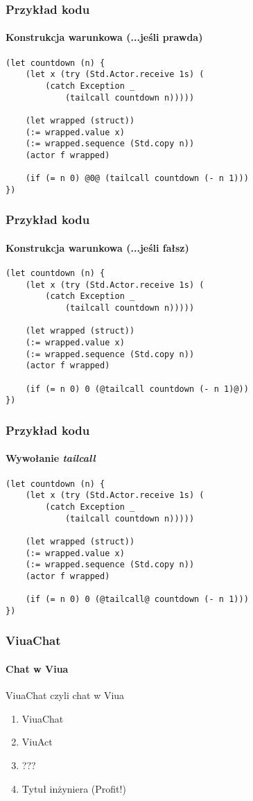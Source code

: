 \documentclass{beamer}
\begin{document}
\begin{frame}[fragile]
    \frametitle{Przykład kodu}
    \framesubtitle{Konstrukcja warunkowa (...jeśli prawda)}

    \begin{small}
    \begin{lstlisting}
(let countdown (n) {
    (let x (try (Std.Actor.receive 1s) (
        (catch Exception _
            (tailcall countdown n)))))

    (let wrapped (struct))
    (:= wrapped.value x)
    (:= wrapped.sequence (Std.copy n))
    (actor f wrapped)

    (if (= n 0) @0@ (tailcall countdown (- n 1)))
})
    \end{lstlisting}
    \end{small}
\end{frame}

\begin{frame}[fragile]
    \frametitle{Przykład kodu}
    \framesubtitle{Konstrukcja warunkowa (...jeśli fałsz)}

    \begin{small}
    \begin{lstlisting}
(let countdown (n) {
    (let x (try (Std.Actor.receive 1s) (
        (catch Exception _
            (tailcall countdown n)))))

    (let wrapped (struct))
    (:= wrapped.value x)
    (:= wrapped.sequence (Std.copy n))
    (actor f wrapped)

    (if (= n 0) 0 (@tailcall countdown (- n 1)@))
})
    \end{lstlisting}
    \end{small}
\end{frame}

\begin{frame}[fragile]
    \frametitle{Przykład kodu}
    \framesubtitle{Wywołanie \emph{tailcall}}

    \begin{small}
    \begin{lstlisting}
(let countdown (n) {
    (let x (try (Std.Actor.receive 1s) (
        (catch Exception _
            (tailcall countdown n)))))

    (let wrapped (struct))
    (:= wrapped.value x)
    (:= wrapped.sequence (Std.copy n))
    (actor f wrapped)

    (if (= n 0) 0 (@tailcall@ countdown (- n 1)))
})
    \end{lstlisting}
    \end{small}
\end{frame}

\begin{frame}
    \frametitle{ViuaChat}
    \framesubtitle{Chat w Viua}

    ViuaChat czyli chat w Viua

    \begin{enumerate}
        \item ViuaChat
        \item ViuAct
        \item ???
        \item Tytuł inżyniera (Profit!)
    \end{enumerate}
\end{frame}
\end{document}
